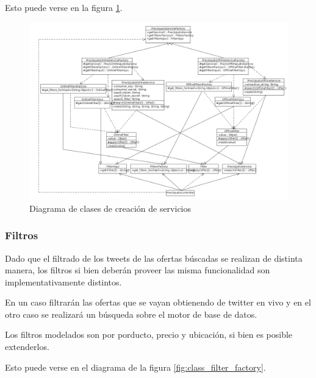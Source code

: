Esto puede verse en la figura \ref{fig:class_service_factory}.

\begin{figure}[h]
\centerline{\includegraphics[width=0.9\paperwidth]{./imgs/class_diagram_service_factory_v2.png}}
\caption{Diagrama de clases de creación de servicios}
\label{fig:class_service_factory} 
\end{figure}

\subsubsection{Filtros}

Dado que el filtrado de los tweets de las ofertas búscadas se realizan de distinta manera, los filtros si bien deberán proveer las misma funcionalidad son implementativamente distintos.

En un caso filtrarán las ofertas que se vayan obtienendo de twitter en vivo y en el otro caso se realizará un búsqueda sobre el motor de base de datos.

Los filtros modelados son por porducto, precio y ubicación, si bien es posible extenderlos.

Esto puede verse en el diagrama de la figura \ref{fig:class_filter_factory}. 

